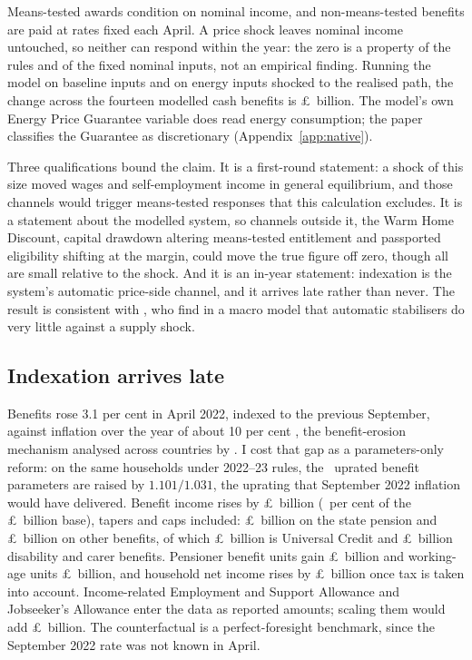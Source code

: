 Means-tested awards condition on nominal income, and non-means-tested
benefits are paid at rates fixed each April. A price shock leaves
nominal income untouched, so neither can respond within the year: the
zero is a property of the rules and of the fixed nominal inputs, not
an empirical finding. Running the model on baseline inputs and on
energy inputs shocked to the realised path, the change across the
fourteen modelled cash benefits is \pounds\SsAutomaticBn\ billion. The
model's own Energy Price Guarantee variable does read energy
consumption; the paper classifies the Guarantee as discretionary
(Appendix~\ref{app:native}).

Three qualifications bound the claim. It is a first-round statement: a
shock of this size moved wages and self-employment income in general
equilibrium, and those channels would trigger means-tested responses
that this calculation excludes. It is a statement about the modelled
system, so channels outside it, the Warm Home Discount, capital
drawdown altering means-tested entitlement and passported eligibility
shifting at the margin, could move the true figure off zero, though
all are small relative to the shock. And it is an in-year statement:
indexation is the system's automatic price-side channel, and it
arrives late rather than never. The result is consistent with
\citet{cohenfollette2000}, who find in a macro model that automatic
stabilisers do very little against a supply shock.

\subsection{Indexation arrives late}\label{sec:results-indexation}

Benefits rose 3.1 per cent in April 2022, indexed to the previous
September, against inflation over the year of about 10 per cent
\citep{cribb2023}, the benefit-erosion mechanism analysed across
countries by \citet{paulus2020}. I cost that gap as a parameters-only reform: on
the same households under 2022--23 rules, the \SsLagReformParameters\
uprated benefit parameters are raised by $1.101/1.031$, the uprating
that September 2022 inflation would have delivered. Benefit income
rises by \pounds\SsLagReformBn\ billion (\SsLagReformPctOfBase\ per
cent of the \pounds\SsLagReformBaseBn\ billion base), tapers and caps
included: \pounds\SsLagReformStatePensionBn\ billion on the state
pension and \pounds\SsLagReformNonStatePensionBn\ billion on other
benefits, of which \pounds\SsLagReformUcBn\ billion is Universal
Credit and \pounds\SsLagReformDisabilityCarerBn\ billion disability
and carer benefits. Pensioner benefit units gain
\pounds\SsLagReformPensionerBn\ billion and working-age units
\pounds\SsLagReformWorkingAgeBn\ billion, and household net income
rises by \pounds\SsLagReformNetIncomeBn\ billion once tax is taken
into account. Income-related Employment and Support Allowance and
Jobseeker's Allowance enter the data as reported amounts; scaling them
would add \pounds\SsLagReformReportedAddOnBn\ billion. The
counterfactual is a perfect-foresight benchmark, since the September
2022 rate was not known in April.

